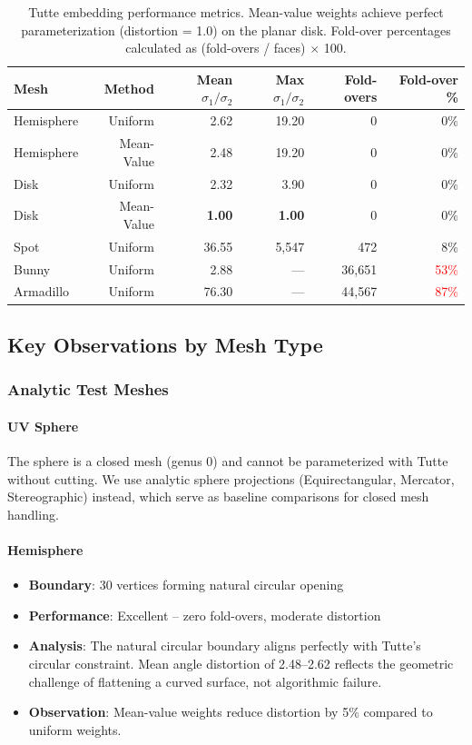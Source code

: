 \documentclass[11pt]{article}
\begin{document}
\begin{table}[H]
\centering
\small
\begin{tabular}{lrrrrr}
\toprule
\textbf{Mesh} & \textbf{Method} & \textbf{Mean $\sigma_1/\sigma_2$} & \textbf{Max $\sigma_1/\sigma_2$} & \textbf{Fold-overs} & \textbf{Fold-over \%} \\
\midrule
Hemisphere & Uniform & 2.62 & 19.20 & 0 & 0\% \\
Hemisphere & Mean-Value & 2.48 & 19.20 & 0 & 0\% \\
\midrule
Disk & Uniform & 2.32 & 3.90 & 0 & 0\% \\
Disk & Mean-Value & \textbf{1.00} & \textbf{1.00} & 0 & 0\% \\
\midrule
Spot & Uniform & 36.55 & 5,547 & 472 & 8\% \\
\midrule
Bunny & Uniform & 2.88 & --- & 36,651 & \textcolor{red}{53\%} \\
\midrule
Armadillo & Uniform & 76.30 & --- & 44,567 & \textcolor{red}{87\%} \\
\bottomrule
\end{tabular}
\caption{Tutte embedding performance metrics. Mean-value weights achieve perfect parameterization (distortion = 1.0) on the planar disk. Fold-over percentages calculated as (fold-overs / faces) $\times$ 100.}
\end{table}

\subsection{Key Observations by Mesh Type}

\subsubsection{Analytic Test Meshes}

\paragraph{UV Sphere}
The sphere is a closed mesh (genus 0) and cannot be parameterized with Tutte without cutting. We use analytic sphere projections (Equirectangular, Mercator, Stereographic) instead, which serve as baseline comparisons for closed mesh handling.

\paragraph{Hemisphere}
\begin{itemize}
    \item \textbf{Boundary}: 30 vertices forming natural circular opening
    \item \textbf{Performance}: Excellent -- zero fold-overs, moderate distortion
    \item \textbf{Analysis}: The natural circular boundary aligns perfectly with Tutte's circular constraint. Mean angle distortion of 2.48--2.62 reflects the geometric challenge of flattening a curved surface, not algorithmic failure.
    \item \textbf{Observation}: Mean-value weights reduce distortion by 5\% compared to uniform weights.
\end{itemize}
\end{document}
